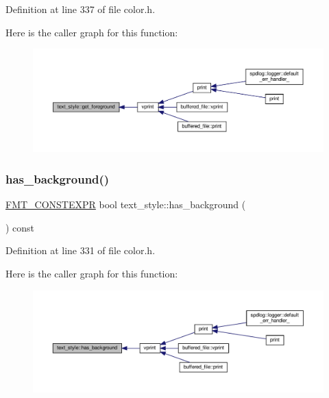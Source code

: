 Definition at line 337 of file color.\+h.

Here is the caller graph for this function\+:
\nopagebreak
\begin{figure}[H]
\begin{center}
\leavevmode
\includegraphics[width=350pt]{classtext__style_a695368429b582c3fef9b28e138beec4a_icgraph}
\end{center}
\end{figure}
\mbox{\label{classtext__style_afa9f90cd308a4a4b61ab8f6d6178a581}} 
\subsubsection{\texorpdfstring{has\+\_\+background()}{has\_background()}}
{\footnotesize\ttfamily \hyperlink{core_8h_a69201cb276383873487bf68b4ef8b4cd}{F\+M\+T\+\_\+\+C\+O\+N\+S\+T\+E\+X\+PR} bool text\+\_\+style\+::has\+\_\+background (\begin{DoxyParamCaption}{ }\end{DoxyParamCaption}) const\hspace{0.3cm}{\ttfamily [inline]}}



Definition at line 331 of file color.\+h.

Here is the caller graph for this function\+:
\nopagebreak
\begin{figure}[H]
\begin{center}
\leavevmode
\includegraphics[width=350pt]{classtext__style_afa9f90cd308a4a4b61ab8f6d6178a581_icgraph}
\end{center}
\end{figure}
\mbox{\label{classtext__style_a57443deabb81d0e013d81813fc4d55cb}} 
